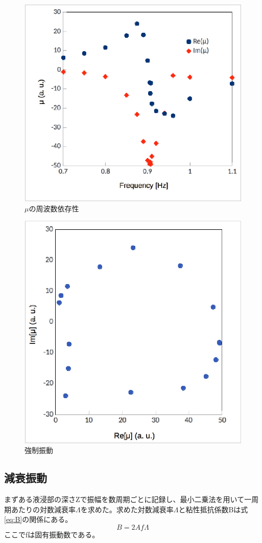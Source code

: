 \documentclass[11pt,a4]{jarticle}
\begin{document}
\begin{figure}[htbp]
\begin{minipage}{0.5\hsize}
\begin{center}
    \includegraphics[width=0.9\hsize]{./mu_frequency.eps}
    \caption{$\mu$の周波数依存性}
     \label{fig:mu_frequency}
   \end{center}
 \end{minipage}
\end{figure}

\begin{figure}[htbp]
   \begin{center}
    \includegraphics[width=0.4\hsize]{./mu.eps}
    \caption{強制振動}
     \label{fig:mu}
   \end{center}
\end{figure}

\subsection{減衰振動}
まずある液浸部の深さZで振幅を数周期ごとに記録し、最小二乗法を用いて一周期あたりの対数減衰率$\Lambda$を求めた。求めた対数減衰率$\Lambda$と粘性抵抗係数Bは式\ref{eq:B}の関係にある。
\begin{equation}
B =  2A f \Lambda
\label{eq:B}
\end{equation}
ここでfは固有振動数である。
\end{document}
